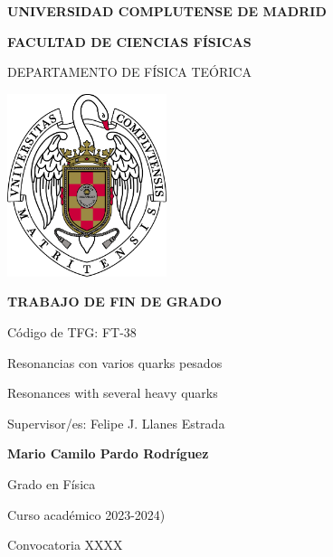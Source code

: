 \documentclass[11pt, a4paper]{article} %
\begin{document}
\begin{titlepage}
\centering
{ \bfseries \Large UNIVERSIDAD COMPLUTENSE DE MADRID}
\vspace{0.5cm}

{\bfseries  \Large FACULTAD DE CIENCIAS FÍSICAS} 
\vspace{1cm}

{\large DEPARTAMENTO DE FÍSICA TEÓRICA}
\vspace{0.8cm}

{\includegraphics[width=0.35\textwidth]{logo_ucm}} %
\vspace{0.8cm}

{\bfseries \Large TRABAJO DE FIN DE GRADO}
\vspace{2cm}

{\Large Código de TFG:  FT-38 } \vspace{5mm}

{\Large Resonancias con varios quarks pesados}\vspace{5mm}

{\Large Resonances with several heavy quarks}\vspace{5mm}

{\Large Supervisor/es: Felipe J. Llanes Estrada}\vspace{20mm} 

{\bfseries \LARGE Mario Camilo Pardo Rodríguez}\vspace{5mm} 

{\large Grado en Física}\vspace{5mm} 

{\large Curso acad\'emico 2023-2024)}\vspace{5mm} 

{\large Convocatoria XXXX}\vspace{5mm} 

\end{titlepage}
\newpage
\end{document}
